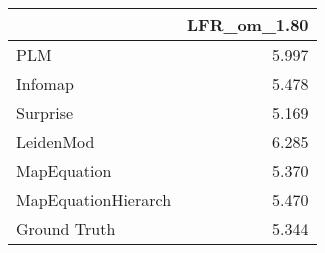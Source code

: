 \begin{tabular}{lr}
\toprule
{} & LFR_om_1.80 \\
\midrule
PLM                 &       5.997 \\
Infomap             &       5.478 \\
Surprise            &       5.169 \\
LeidenMod           &       6.285 \\
MapEquation         &       5.370 \\
MapEquationHierarch &       5.470 \\
Ground Truth        &       5.344 \\
\bottomrule
\end{tabular}
